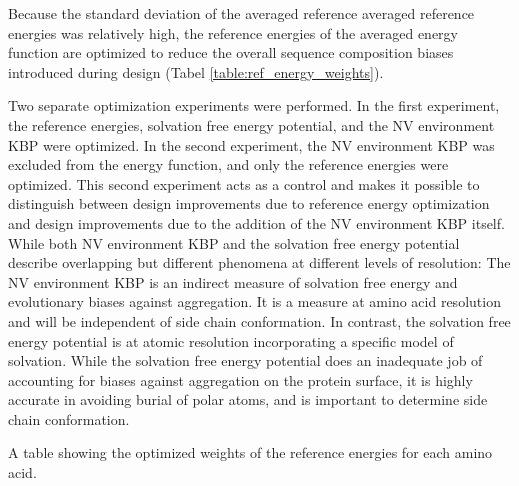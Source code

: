 Because the standard deviation of the averaged reference averaged reference energies was relatively high, the reference energies of the averaged energy function are optimized to reduce the overall sequence composition biases introduced during design (Tabel \ref{table:ref_energy_weights}).

Two separate optimization experiments were performed.
In the first experiment, the reference energies, solvation free energy potential, and the NV environment KBP were optimized.
In the second experiment, the NV environment KBP was excluded from the energy function, and only the reference energies were optimized.
This second experiment acts as a control and makes it possible to distinguish between design improvements due to reference energy optimization and design improvements due to the addition of the NV environment KBP itself.
While both NV environment KBP and the solvation free energy potential describe overlapping but different phenomena at different levels of resolution: The NV environment KBP is an indirect measure of solvation free energy and evolutionary biases against aggregation.
It is a measure at amino acid resolution and will be independent of side chain conformation.
In contrast, the solvation free energy potential is at atomic resolution incorporating a specific model of solvation.
While the solvation free energy potential does an inadequate job of accounting for biases against aggregation on the protein surface, it is highly accurate in avoiding burial of polar atoms, and is important to determine side chain conformation.

\begin{table}
\scriptsize
\renewcommand{\tabcolsep}{0.09cm}
\centering

\caption{A table showing the optimized weights of the reference energies for each amino acid. }
\label{table:ref_energy_weights}
\end{table}


